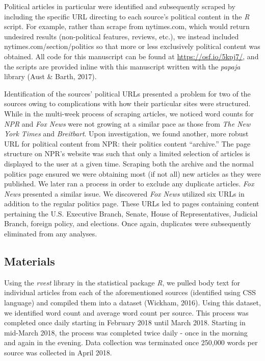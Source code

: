 \documentclass[english,,man]{apa6}
\begin{document}
Political articles in particular were identified and subsequently
scraped by including the specific URL directing to each source's
political content in the \emph{R} script. For example, rather than
scrape from nytimes.com, which would return undesired results
(non-political features, reviews, etc.), we instead included
nytimes.com/section/politics so that more or less exclusively political
content was obtained. All code for this manuscript can be found at
\url{https://osf.io/5kpj7/}, and the scripts are provided inline with
this manuscript written with the \emph{papaja} library (Aust \& Barth,
2017).

Identification of the sources' political URLs presented a problem for
two of the sources owing to complications with how their particular
sites were structured. While in the multi-week process of scraping
articles, we noticed word counts for \emph{NPR} and \emph{Fox News} were
not growing at a similar pace as those from \emph{The New York Times}
and \emph{Breitbart}. Upon investigation, we found another, more robust
URL for political content from NPR: their politics content
\enquote{archive.} The page structure on NPR's website was such that
only a limited selection of articles is displayed to the user at a given
time. Scraping both the archive and the normal politics page ensured we
were obtaining most (if not all) new articles as they were published. We
later ran a process in order to exclude any duplicate articles.
\emph{Fox News} presented a similar issue. We discovered \emph{Fox News}
utilized six URLs in addition to the regular politics page. These URLs
led to pages containing content pertaining the U.S. Executive Branch,
Senate, House of Representatives, Judicial Branch, foreign policy, and
elections. Once again, duplicates were subsequently eliminated from any
analyses.

\subsection{Materials}\label{materials}

Using the \emph{rvest} library in the statistical package \emph{R}, we
pulled body text for individual articles from each of the aforementioned
sources (identified using CSS language) and compiled them into a dataset
(Wickham, 2016). Using this dataset, we identified word count and
average word count per source. This process was completed once daily
starting in February 2018 until March 2018. Starting in mid-March 2018,
the process was completed twice daily - once in the morning and again in
the evening. Data collection was terminated once 250,000 words per
source was collected in April 2018.
\end{document}
